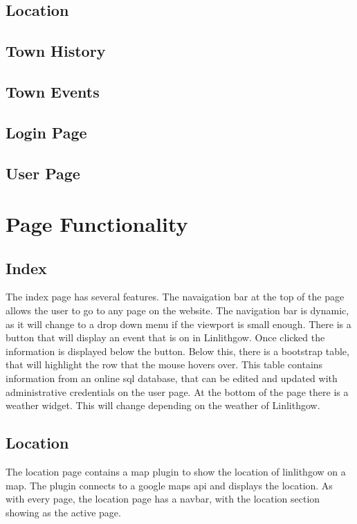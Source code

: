\documentclass[12pt,a4paper]{article}
\begin{document}
		\subsection{Location}

		\subsection{Town History}

		\subsection{Town Events}

		\subsection{Login Page}

		\subsection{User Page}

	\clearpage

	\section{Page Functionality}
		\subsection{Index}
		The index page has several features. The navaigation bar at the top of the page allows the user to go to any page on the website. The navigation bar is dynamic, as it will change to a drop down menu if the viewport is small enough. There is a button that will display an event that is on in Linlithgow. Once clicked the information is displayed below the button. Below this, there is a bootstrap table, that will highlight the row that the mouse hovers over. This table contains information from an online sql database, that can be edited and updated with administrative credentials on the user page. At the bottom of the page there is a weather widget. This will change depending on the weather of Linlithgow.

		\subsection{Location}
		The location page contains a map plugin to show the location of linlithgow on a map. The plugin connects to a google maps api and displays the location. As with every page, the location page has a navbar, with the location section showing as the active page.
\end{document}
